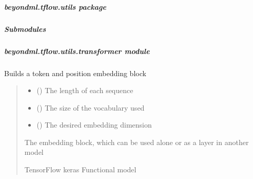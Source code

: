 \documentclass[letterpaper,10pt,english]{sphinxmanual}
\begin{document}
\sphinxstepscope


\subparagraph{beyondml.tflow.utils package}
\label{\detokenize{beyondml.tflow.utils:beyondml-tflow-utils-package}}\label{\detokenize{beyondml.tflow.utils::doc}}

\subparagraph{Submodules}
\label{\detokenize{beyondml.tflow.utils:submodules}}

\subparagraph{beyondml.tflow.utils.transformer module}
\label{\detokenize{beyondml.tflow.utils:module-beyondml.tflow.utils.transformer}}\label{\detokenize{beyondml.tflow.utils:beyondml-tflow-utils-transformer-module}}

\begin{fulllineitems}
\label{\detokenize{beyondml.tflow.utils:beyondml.tflow.utils.transformer.build_token_position_embedding_block}}
\pysigstartsignatures
{}
\pysigstopsignatures
\sphinxAtStartPar
Builds a token and position embedding block
\begin{quote}\begin{description}
\begin{itemize}
\item {} 
\sphinxAtStartPar
{} () \textendash{} The length of each sequence

\item {} 
\sphinxAtStartPar
{} () \textendash{} The size of the vocabulary used

\item {} 
\sphinxAtStartPar
{} () \textendash{} The desired embedding dimension

\end{itemize}

\sphinxAtStartPar
{} \textendash{} The embedding block, which can be used alone or
as a layer in another model

\sphinxAtStartPar
TensorFlow keras Functional model

\end{description}\end{quote}

\end{fulllineitems}
\end{document}
